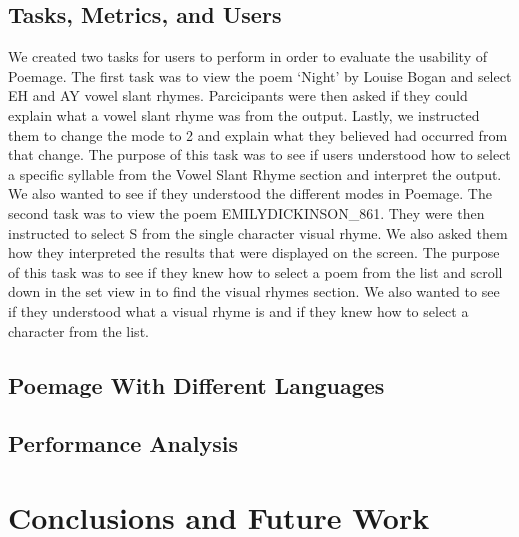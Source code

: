 \documentclass[journal]{vgtc}                %
\begin{document}
\subsection{Tasks, Metrics, and Users}
We created two tasks for users to perform in order to evaluate the usability of Poemage. 
The first task was to view the poem ‘Night’ by Louise Bogan and select EH and AY vowel slant rhymes. 
Parcicipants were then asked if they could explain what a vowel slant rhyme was from the output. 
Lastly, we instructed them to change the mode to 2 and explain what they believed had occurred from that change. 
The purpose of this task was to see if users understood how to select a specific syllable from the Vowel Slant Rhyme section and interpret the output. 
We also wanted to see if they understood the different modes in Poemage. 
\indent The second task was to view the poem EMILYDICKINSON\_861. 
They were then instructed to select S from the single character visual rhyme. 
We also asked them how they interpreted the results that were displayed on the screen. 
The purpose of this task was to see if they knew how to select a poem from the list and scroll down in the set view in to find the visual rhymes section. 
We also wanted to see if they understood what a visual rhyme is and if they knew how to select a character from the list. 
\subsection{Poemage With Different Languages}

\subsection{Performance Analysis}

\section{Conclusions and Future Work} \label{conclusion}


\newpage
%

%
%
%


\end{document}
